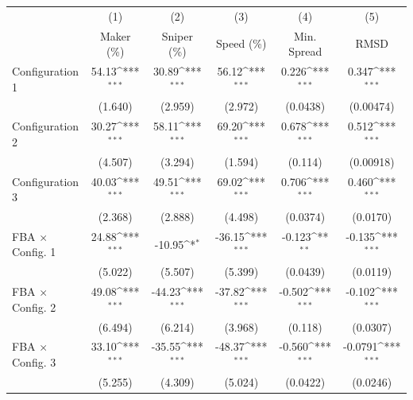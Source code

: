\documentclass[12pt]{article}
\def\sym#1{\ifmmode^{#1}\else\(^{#1}\)\fi}
\begin{document}
\begin{table}
\centering
\begin{tabular}{l*{5}{c}}
\toprule
&\multicolumn{1}{c}{(1)}         &\multicolumn{1}{c}{(2)}      &\multicolumn{1}{c}{ (3)}     &\multicolumn{1}{c}{(4)}    &\multicolumn{1}{c}{(5)}         \\
&\multicolumn{1}{c}{Maker (\%)}         &\multicolumn{1}{c}{Sniper (\%)}         &\multicolumn{1}{c}{Speed (\%)}         &\multicolumn{1}{c}{Min. Spread}         &\multicolumn{1}{c}{RMSD}         \\
\midrule
Configuration 1                  &       54.13\sym{***}&       30.89\sym{***}&       56.12\sym{***}&       0.226\sym{***}&       0.347\sym{***}\\
                    &     (1.640)         &     (2.959)         &     (2.972)         &    (0.0438)         &   (0.00474)         \\
[1em]
Configuration 2                  &       30.27\sym{***}&       58.11\sym{***}&       69.20\sym{***}&       0.678\sym{***}&       0.512\sym{***}\\
                    &     (4.507)         &     (3.294)         &     (1.594)         &     (0.114)         &   (0.00918)         \\
[1em]
Configuration 3                  &       40.03\sym{***}&       49.51\sym{***}&       69.02\sym{***}&       0.706\sym{***}&       0.460\sym{***}\\
                    &     (2.368)         &     (2.888)         &     (4.498)         &    (0.0374)         &    (0.0170)         \\
[1em]
FBA $\times$ Config. 1         &       24.88\sym{***}&      -10.95\sym{*}  &      -36.15\sym{***}&      -0.123\sym{**} &      -0.135\sym{***}\\
                    &     (5.022)         &     (5.507)         &     (5.399)         &    (0.0439)         &    (0.0119)         \\
[1em]
FBA $\times$ Config. 2   &       49.08\sym{***}&      -44.23\sym{***}&      -37.82\sym{***}&      -0.502\sym{***}&      -0.102\sym{***}\\
                    &     (6.494)         &     (6.214)         &     (3.968)         &     (0.118)         &    (0.0307)         \\
[1em]
FBA $\times$ Config. 3         &       33.10\sym{***}&      -35.55\sym{***}&      -48.37\sym{***}&      -0.560\sym{***}&     -0.0791\sym{***}\\
                    &     (5.255)         &     (4.309)         &     (5.024)         &    (0.0422)         &    (0.0246)         \\

\end{tabular}
\end{table}
\end{document}

